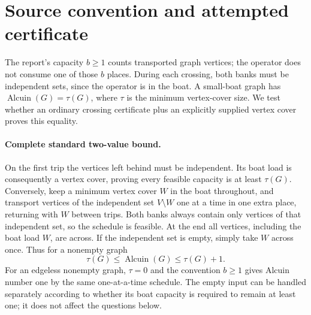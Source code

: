 \documentclass[11pt]{article}
\begin{document}
\section{Source convention and attempted certificate}
The report's capacity $b\ge1$ counts transported graph vertices; the operator
does not consume one of those $b$ places. During each crossing, both banks
must be independent sets, since the operator is in the boat. A small-boat
graph has $\operatorname{Alcuin}(G)=\tau(G)$, where $\tau$ is the minimum
vertex-cover size. We test whether an ordinary crossing certificate plus
an explicitly supplied vertex cover proves this equality.

\paragraph{Complete standard two-value bound.}
On the first trip the vertices left behind must be independent. Its boat
load is consequently a vertex cover, proving every feasible capacity is
at least $\tau(G)$. Conversely, keep a minimum vertex cover $W$ in the
boat throughout, and transport vertices of the independent set $V\setminus W$
one at a time in one extra place, returning with $W$ between trips.
Both banks always contain only vertices of that independent set, so the
schedule is feasible. At the end all vertices, including the boat load $W$,
are across. If the independent set is empty, simply take $W$ across once.
Thus for a nonempty graph
\[
\tau(G)\le\operatorname{Alcuin}(G)\le\tau(G)+1.
\]
For an edgeless nonempty graph, $\tau=0$ and the convention $b\ge1$
gives Alcuin number one by the same one-at-a-time schedule. The empty
input can be handled separately according to whether its boat capacity is
required to remain at least one; it does not affect the questions below.
\end{document}
